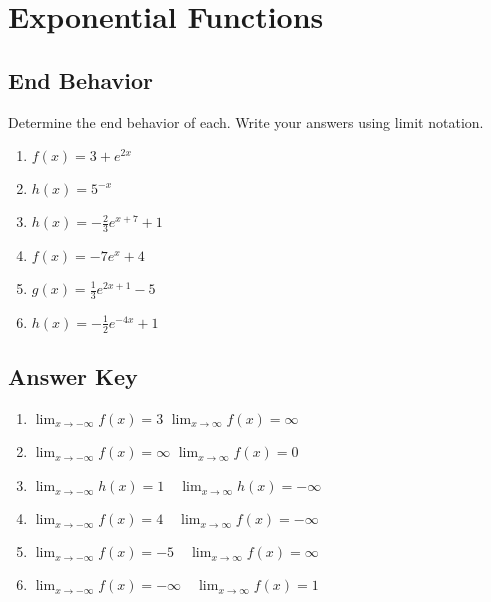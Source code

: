 \chapter{Exponential Functions}

\section{End Behavior}

Determine the end behavior of each. Write your answers using limit notation.
\begin{enumerate}
	\item $f(x) = 3 + e^{2x}$
	\item $h(x) = 5^{-x}$
	\item $h(x) = -\frac{2}{3}e^{x+7} + 1$
	\item $f(x) = -7e^x + 4$
	\item $g(x) = \frac{1}{3}e^{2x+1}-5$
	\item $h(x) = -\frac{1}{2}e^{-4x} + 1$
\end{enumerate}

\newpage

\section{Answer Key}

\begin{enumerate}
	\item $\lim_{x \to -\infty} f(x) = 3$ \quad $\lim_{x \to \infty} f(x) = \infty$
	\item $\lim_{x \to -\infty} f(x) = \infty$ \quad $\lim_{x \to \infty} f(x) =0$ 
	\item $\lim_{x \to -\infty} h(x) = 1 \quad \lim_{x \to \infty} h(x) = - \infty$
	\item $\lim_{x \to -\infty} f(x) = 4 \quad \lim_{x \to \infty} f(x) = -\infty$
    \item $\lim_{x \to -\infty} f(x) = -5 \quad \lim_{x \to \infty} f(x) = \infty$
    \item $\lim_{x \to -\infty} f(x) = -\infty \quad \lim_{x \to \infty} f(x) = 1$
\end{enumerate}
